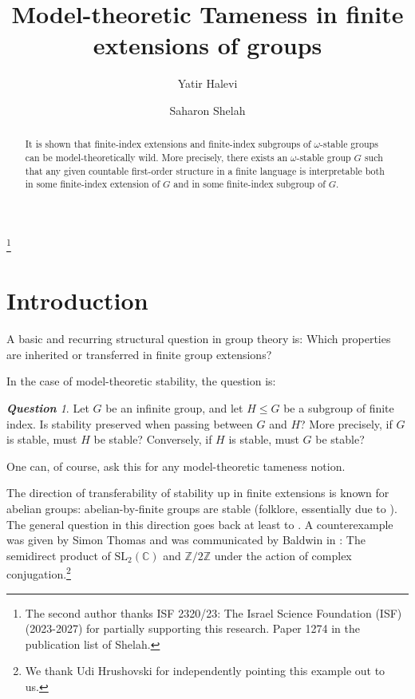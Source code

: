\documentclass[11pt]{amsart}
\theoremstyle{plain}
\theoremstyle{definition}
\theoremstyle{remark}
\newtheorem{question}[theorem]{\textbf{Question}}
\numberwithin{equation}{section}
\begin{document}
\title{Model-theoretic Tameness in finite extensions of groups}

\author{Yatir Halevi}
\address{Faculty of Mathematics\\Technion - Israel Institute of Technology\\Haifa\\ Israel.}

\author{Saharon Shelah}
\address{Einstein Institute of Mathematics\\Hebrew University of Jerusalem\\91904\\Jerusalem\\
Israel.}


\thanks{The second author thanks ISF 2320/23: The Israel Science Foundation (ISF) (2023-2027) for partially supporting this research. Paper 1274 in the publication list of Shelah.}

\begin{abstract}
It is shown that finite-index extensions and finite-index subgroups of $\omega$-stable groups can be model-theoretically wild. More precisely, there exists an $\omega$-stable group $G$ such that any given countable first-order structure in a finite language is interpretable both in some finite-index extension of $G$ and in some finite-index subgroup of $G$.
\end{abstract}

\maketitle
\section{Introduction}
A basic and recurring structural question in group theory is: Which properties are inherited or transferred in finite group extensions?

In the case of model-theoretic stability, the question is:
\begin{question}
    Let $G$ be an infinite group, and let $H\leq G$ be a subgroup of finite index. Is stability preserved when passing between $G$ and $H$? More precisely, if $G$ is stable, must $H$ be stable? Conversely, if $H$ is stable, must $G$ be stable?
\end{question}
One can, of course, ask this for any model-theoretic tameness notion.

The direction of transferability of stability up in finite extensions is known for abelian groups: abelian-by-finite groups are stable (folklore, essentially due to \cite{BaChMa}). The general question in this direction goes back at least to \cite{Meirembekov}. A counterexample was given by Simon Thomas and was communicated by Baldwin in \cite[Example 3.2]{baldwin}: The semidirect product of $\mathrm{SL}_2(\mathbb{C})$ and $\mathbb{Z}/2\mathbb{Z}$ under the action of complex conjugation.\footnote{We thank Udi Hrushovski for independently pointing this example out to us.}
\end{document}
